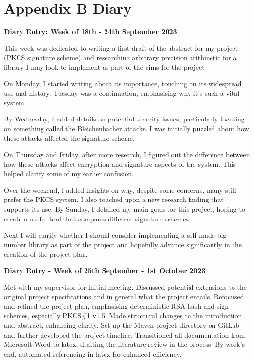 \documentclass[]{final_report}
\theoremstyle{definition}
\begin{document}
\chapter{Appendix B Diary}

\textbf{Diary Entry: Week of 18th - 24th September 2023}

This week was dedicated to writing a first draft of the abstract for my project (PKCS signature scheme) and researching arbitrary precision arithmetic for a library I may look to implement as part of the aims for the project

On Monday, I started writing about its importance, touching on its widespread use and history.
Tuesday was a continuation, emphasising why it's such a vital system.

By Wednesday, I added details on potential security issues, particularly focusing on something
called the Bleichenbacher attacks. I was initially puzzled about how these attacks affected the
signature scheme.

On Thursday and Friday, after more research, I figured out the difference between how these attacks
affect encryption and signature aspects of the system. This helped clarify some of my earlier
confusion.

Over the weekend, I added insights on why, despite some concerns, many still prefer the PKCS system.
I also touched upon a new research finding that supports its use. By Sunday, I detailed my main
goals for this project, hoping to create a useful tool that compares different signature schemes.

Next I will clarify whether I should consider implementing a self-made big number library as part of
the project and hopefully advance significantly in the creation of the project plan.

\textbf{Diary Entry - Week of 25th September - 1st October 2023}

Met with my supervisor for initial meeting. Discussed potential extensions to the original project
specifications and in general what the project entails. Refocused and refined the project plan,
emphasising deterministic RSA hash-and-sign schemes, especially PKCS\#1 v1.5. Made structural changes
to the introduction and abstract, enhancing clarity. Set up the Maven project directory on GitLab
and further developed the project timeline. Transitioned all documentation from Microsoft Word to
latex, drafting the literature review in the process. By week's end, automated referencing in latex
for enhanced efficiency.
\end{document}
